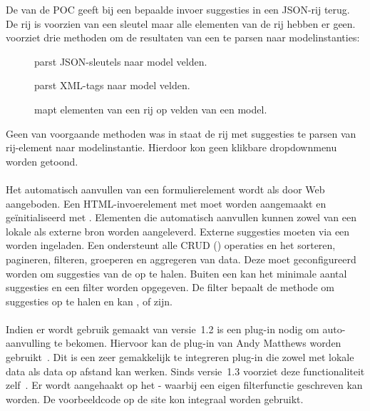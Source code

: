 De  van de POC geeft bij een bepaalde invoer suggesties in een JSON-rij terug.
De rij is voorzien van een sleutel maar alle elementen van de rij hebben er geen.
\st{} voorziet drie methoden om de resultaten van een  te parsen naar modelinstanties:
\begin{description}
 \item [] parst JSON-sleutels naar model velden.
 \item [] parst XML-tags naar model velden.
 \item [] mapt elementen van een rij op velden van een model.
\end{description}
Geen van voorgaande methoden was in staat de rij met suggesties te parsen van rij-element naar modelinstantie.
Hierdoor kon geen klikbare dropdownmenu worden getoond.

\paragraph{\kendo}
Het automatisch aanvullen van een formulierelement wordt als  door \kendo{} Web aangeboden.
Een HTML-invoerelement met  moet worden aangemaakt en geïnitialiseerd met .
Elementen die automatisch aanvullen kunnen zowel van een lokale als externe bron worden aangeleverd.
Externe suggesties moeten via een  worden ingeladen.
Een  ondersteunt alle CRUD () operaties en het sorteren, pagineren, filteren, groeperen en aggregeren van data.
Deze moet geconfigureerd worden om suggesties van de  op te halen.
Buiten een  kan het minimale aantal suggesties en een filter worden opgegeven.
De filter bepaalt de methode om suggesties op te halen en kan ,  of  zijn.

\paragraph{\jqm}
Indien er wordt gebruik gemaakt van versie~1.2 is een plug-in nodig om auto-aanvulling te bekomen.
Hiervoor kan de plug-in van Andy Matthews worden gebruikt~\cite{Matthews2013}. 
Dit is een zeer gemakkelijk te integreren plug-in die zowel met lokale data als data op afstand kan werken.
Sinds versie~1.3 voorziet \jqm{} deze functionaliteit zelf~\cite{JQuery2013c}.
Er wordt aangehaakt op het - waarbij een eigen filterfunctie geschreven kan worden.
De voorbeeldcode op de site kon integraal worden gebruikt. 

